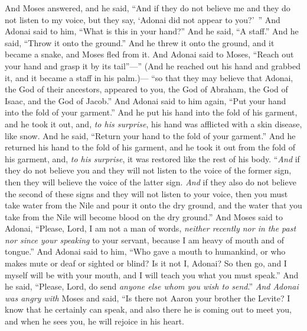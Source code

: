 \begin{biblechapter} %
 And Moses answered, and he said, “And if they do not believe me and they do not listen to my voice, but they say, ‘Adonai did not appear to you?’ ”
\verse And Adonai said to him, “What is this in your hand?” And he said, “A staff.”
\verse And he said, “Throw it onto the ground.” And he threw it onto the ground, and it became a snake, and Moses fled from it.
\verse And Adonai said to Moses, “Reach out your hand and grasp it by its tail”—” (And he reached out his hand and grabbed it, and it became a staff in his palm.)—
\verse “so that they may believe that Adonai, the God of their ancestors, appeared to you, the God of Abraham, the God of Isaac, and the God of Jacob.”
\verse And Adonai said to him again, “Put your hand into the fold of your garment.” And he put his hand into the fold of his garment, and he took it out, and, \textit{to his surprise}, his hand was afflicted with a skin disease, like snow.
\verse And he said, “Return your hand to the fold of your garment.” And he returned his hand to the fold of his garment, and he took it out from the fold of his garment, and, \textit{to his surprise}, it was restored like the rest of his body.
\verse “\textit{And} if they do not believe you and they will not listen to the voice of the former sign, then they will believe the voice of the latter sign.
\verse \textit{And} if they also do not believe the second of these signs and they will not listen to your voice, then you must take water from the Nile and pour it onto the dry ground, and the water that you take from the Nile will become blood on the dry ground.”
\verse And Moses said to Adonai, “Please, Lord, I am not a man of words, \textit{neither recently nor in the past nor since your speaking} to your servant, because I am heavy of mouth and of tongue.”
\verse And Adonai said to him, “Who gave a mouth to humankind, or who makes mute or deaf or sighted or blind? Is it not I, Adonai?
\verse So then go, and I myself will be with your mouth, and I will teach you what you must speak.”
\verse And he said, “Please, Lord, do send \textit{anyone else whom you wish to send}.”
\verse \textit{And Adonai was angry with} Moses and said, “Is there not Aaron your brother the Levite? I know that he certainly can speak, and also there he is coming out to meet you, and when he sees you, he will rejoice in his heart.

\end{biblechapter}
